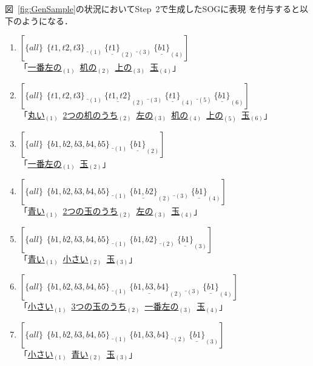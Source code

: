 \documentclass[japanese]{jnlp_1.2}
\def\mrel#1{}
\def\mextrel{}
\begin{document}
図~\ref{fig:GenSample}の状況においてStep~2で生成したSOGに表現
を付与すると以下のようになる．
\begin{enumerate}\itemsep=0.8ex
\item $[\{all\}\ \mrel{type}\ \{t1,t2,t3\}\ \underline{\mrel{space}}_{(1)}\ \underline{\{t1\}}_{(2)}\ \underline{\mextrel}_{(3)}\ \underline{\{b1\}}_{(4)}]$\\ 
「\underline{一番左の}$_{(1)}$\ \underline{机の}$_{(2)}$\ \underline{上の}$_{(3)}$\ \underline{玉}$_{(4)}$」
\item $[\{all\}\ \mrel{type}\ \{t1,t2,t3\}\ \underline{\mrel{shape}}_{(1)}\ \underline{\{t1,t2\}}_{(2)}\ \underline{\mrel{space}}_{(3)}\ \underline{\{t1\}}_{(4)}\ \underline{\mextrel}_{(5)}\ \underline{\{b1\}}_{(6)}]$\\ 
「\underline{丸い}$_{(1)}$\  \underline{2つの机のうち}$_{(2)}$\ \underline{左の}$_{(3)}$\ \underline{机の}$_{(4)}$\ \underline{上の}$_{(5)}$\ \underline{玉}$_{(6)}$」
\item $[\{all\}\ \mrel{type}\ \{b1,b2,b3,b4,b5\}\ \underline{\mrel{space}}_{(1)}\ \underline{\{b1\}}_{(2)}]$\\ 
「\underline{一番左の}$_{(1)}$\ \underline{玉}$_{(2)}$」
\item $[\{all\}\ \mrel{type}\ \{b1,b2,b3,b4,b5\}\ \underline{\mrel{color}}_{(1)}\ \underline{\{b1,b2\}}_{(2)}\ \underline{\mrel{space}}_{(3)}\ \underline{\{b1\}}_{(4)}]$\\
「\underline{青い}$_{(1)}$\ \underline{2つの玉のうち}$_{(2)}$\ \underline{左の}$_{(3)}$\ \underline{玉}$_{(4)}$」
\item
  $[\{all\}\ \mrel{type}\ \{b1,b2,b3,b4,b5\}\ \underline{\mrel{color}}_{(1)}\ \{b1,b2\}\ \underline{\mrel{size}}_{(2)}\ \underline{\{b1\}}_{(3)}]$\\ 
「\underline{青い}$_{(1)}$\ \underline{小さい}$_{(2)}$\ \underline{玉}$_{(3)}$」
\item $[\{all\}\ \mrel{type}\ \{b1,b2,b3,b4,b5\}\ \underline{\mrel{size}}_{(1)}\ \underline{\{b1,b3,b4\}}_{(2)}\ \underline{\mrel{space}}_{(3)}\ \underline{\{b1\}}_{(4)}]$\\ 
「\underline{小さい}$_{(1)}$\ \underline{3つの玉のうち}$_{(2)}$\ \underline{一番左の}$_{(3)}$\ \underline{玉}$_{(4)}$」
\item
  $[\{all\}\ \mrel{type}\ \{b1,b2,b3,b4,b5\}\ \underline{\mrel{size}}_{(1)}\ \{b1,b3,b4\}\ \underline{\mrel{color}}_{(2)}\ \underline{\{b1\}}_{(3)}]$\\ 
「\underline{小さい}$_{(1)}$\ \underline{青い}$_{(2)}$\ \underline{玉}$_{(3)}$」

\end{enumerate}
\end{document}
